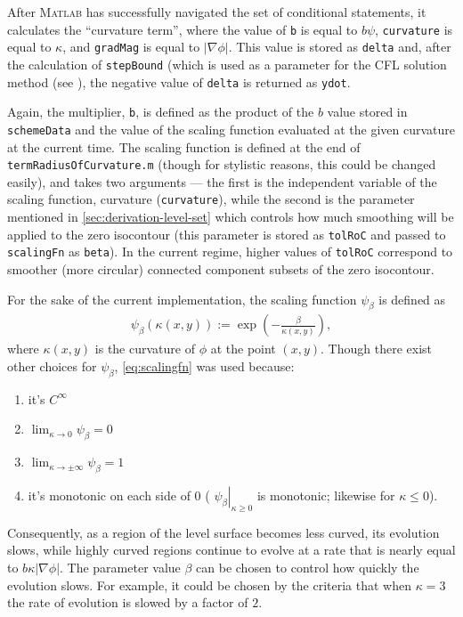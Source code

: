 \documentclass{article}
\begin{document}
After \textsc{Matlab} has successfully navigated the set of
conditional statements, it calculates the ``curvature term'',
where the value of \texttt{b} is equal to $b\psi$,
\texttt{curvature} is equal to $\kappa$, and \texttt{gradMag} is
equal to $\left|\nabla\phi\right|$. This value is stored as
\texttt{delta} and, after the calculation of \texttt{stepBound}
(which is used as a parameter for the CFL solution method (see
\cite{mitchell, osher2003}), the negative value of \texttt{delta}
is returned as \texttt{ydot}. 



Again, the multiplier, \texttt{b}, is defined as the product of
the $b$ value stored in \texttt{schemeData} and the value of the
scaling function evaluated at the given curvature at the current
time. The scaling function is defined at the end of
\texttt{termRadiusOfCurvature.m} (though for stylistic reasons,
this could be changed easily), and takes two arguments --- the
first is the independent variable of the scaling function,
curvature (\texttt{curvature}), while the second is the parameter
mentioned in \autoref{sec:derivation-level-set} which controls how
much smoothing will be applied to the zero isocontour (this
parameter is stored as \texttt{tolRoC} and passed to
\texttt{scalingFn} as \texttt{beta}). In the current regime,
higher values of \texttt{tolRoC} correspond to smoother (\ie more
circular) connected component subsets of the zero isocontour.

For the sake of the current implementation, the
scaling function $\psi_\beta$ is defined as
\begin{align}
\label{eq:scalingfn}
  \psi_\beta(\kappa(x,y)) :=
  \exp\left(-\frac{\beta}{\kappa(x,y)}\right),
\end{align}
where $\kappa(x,y)$ is the curvature of $\phi$ at the point
$(x,y)$. Though there exist other choices for $\psi_\beta$,
\autoref{eq:scalingfn} was used because:
\begin{enumerate}
\item it's $C^\infty$
\item $\lim_{\kappa\to0} \psi_\beta = 0$
\item $\lim_{\kappa\to\pm\infty} \psi_\beta = 1$
\item it's monotonic on each side of $0$ (\ie
  $\left.\psi_\beta\right|_{\kappa\geq0}$ is monotonic; likewise
  for $\kappa\leq 0$).
\end{enumerate}
Consequently, as a region of the level surface becomes less
curved, its evolution slows, while highly curved regions continue
to evolve at a rate that is nearly equal to
$b\kappa\left|\nabla\phi\right|$. The parameter value $\beta$ can
be chosen to control how quickly the evolution slows. For example,
it could be chosen by the criteria that when $\kappa = 3$ the rate
of evolution is slowed by a factor of $2$.
\end{document}
